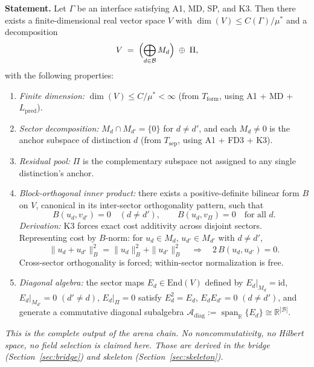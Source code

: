 \documentclass[11pt,a4paper]{article}
\theoremstyle{definition}
\newcommand{\End}{\mathrm{End}}
\DeclareMathOperator{\spn}{span}
\begin{document}
\begin{tcolorbox}[apfbox, title={$T_{\mathrm{sector}}$: Finite Orthogonal Sector Form of an Admissible Interface}]
\textbf{Statement.}  Let $\Gamma$ be an interface satisfying A1, MD, SP, and K3.  Then there exists a finite-dimensional real vector space $V$ with $\dim(V) \le C(\Gamma)/\mu^*$ and a decomposition
\[
V \;=\; \Bigl(\bigoplus_{d \in \mathcal{B}} M_d\Bigr) \;\oplus\; \Pi,
\]
with the following properties:
\begin{enumerate}[nosep,leftmargin=2em,label=(\roman*)]
\item \textit{Finite dimension:} $\dim(V) \le C/\mu^* < \infty$ \textup{(}from $T_{\mathrm{form}}$, using A1 + MD + $L_{\mathrm{pred}}$\textup{)}.
\item \textit{Sector decomposition:} $M_d \cap M_{d'} = \{0\}$ for $d \ne d'$, and each $M_d \ne 0$ is the anchor subspace of distinction $d$ \textup{(}from $T_{\mathrm{sep}}$, using A1 + FD3 + K3\textup{)}.
\item \textit{Residual pool:} $\Pi$ is the complementary subspace not assigned to any single distinction's anchor.
\item \textit{Block-orthogonal inner product:} there exists a positive-definite bilinear form $B$ on $V$, canonical in its inter-sector orthogonality pattern, such that
\[
B(u_d, v_{d'}) = 0 \quad (d \ne d'), \qquad B(u_d, v_\Pi) = 0 \quad \text{for all } d.
\]
\textit{Derivation:} K3 forces exact cost additivity across disjoint sectors.  Representing cost by $B$-norm: for $u_d \in M_d$, $u_{d'} \in M_{d'}$ with $d \ne d'$,
\[
\|u_d + u_{d'}\|_B^2 = \|u_d\|_B^2 + \|u_{d'}\|_B^2 \quad\Longrightarrow\quad 2\,B(u_d, u_{d'}) = 0.
\]
Cross-sector orthogonality is forced; within-sector normalization is free.
\item \textit{Diagonal algebra:} the sector maps $E_d \in \End(V)$ defined by $E_d|_{M_d} = \mathrm{id}$, $E_d|_{M_{d'}} = 0$ $(d' \ne d)$, $E_d|_\Pi = 0$ satisfy $E_d^2 = E_d$, $E_d E_{d'} = 0$ $(d \ne d')$, and generate a commutative diagonal subalgebra $\mathcal{A}_{\mathrm{diag}} := \spn_\mathbb{R}\{E_d\} \cong \mathbb{R}^{|\mathcal{B}|}$.
\end{enumerate}

\smallskip\noindent\textit{This is the complete output of the arena chain.  No noncommutativity, no Hilbert space, no field selection is claimed here.  Those are derived in the bridge (Section~\ref{sec:bridge}) and skeleton (Section~\ref{sec:skeleton}).}
\end{tcolorbox}
\end{document}
